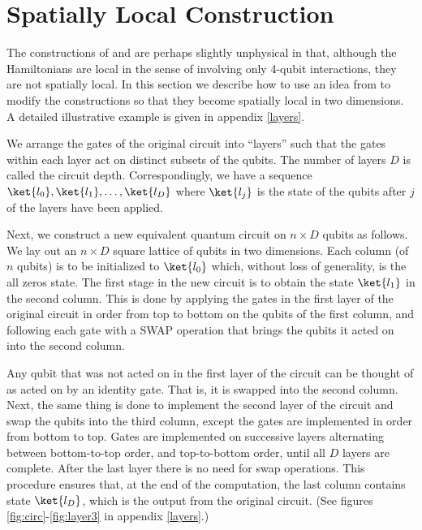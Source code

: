 \documentclass[11pt]{article}
\begin{document}
\section{Spatially Local Construction}
\label{sec:local}

The constructions of  and  are perhaps slightly unphysical in that, although the Hamiltonians are local in the sense of involving only 4-qubit interactions, they are not spatially local. In this section we describe how to use an idea from \cite{Nagaj12} to modify the constructions so that they become spatially local in two dimensions. A detailed illustrative example is given in appendix \ref{layers}.

We arrange the gates of the original circuit into ``layers'' such that the gates within each layer act on distinct subsets of the qubits. The number of layers $D$ is called the circuit depth. Correspondingly, we have a sequence $\ket{l_0},\ket{l_1}, \ldots, \ket{l_D}$ where $\ket{l_j}$ is the state of the qubits after $j$ of the layers have been applied. 

Next, we construct a new equivalent quantum circuit on $n \times D$ qubits as follows. We lay out an $n \times D$ square lattice of qubits in two dimensions. Each column (of $n$ qubits) is to be initialized to $\ket{l_0}$ which, without loss of generality, is the all zeros state. The first stage in the new circuit is to obtain the state $\ket{l_1}$ in the second column. This is done by applying the gates in the first layer of the original circuit in order from top to bottom on the qubits of the first column, and following each gate with a SWAP operation that brings the qubits it acted on into the second column.

Any qubit that was not acted on in the first layer of the circuit can be thought of as acted on by an identity gate. That is, it is swapped into the second column. Next, the same thing is done to implement the second layer of the circuit and swap the qubits into the third column, except the gates are implemented in order from bottom to top. Gates are implemented on successive layers alternating between bottom-to-top order, and top-to-bottom order, until all $D$ layers are complete. After the last layer there is no need for swap operations. This procedure ensures that, at the end of the computation, the last column contains state $\ket{l_D}$, which is the output from the original circuit. (See figures \ref{fig:circ}-\ref{fig:layer3} in appendix \ref{layers}.)
\end{document}
